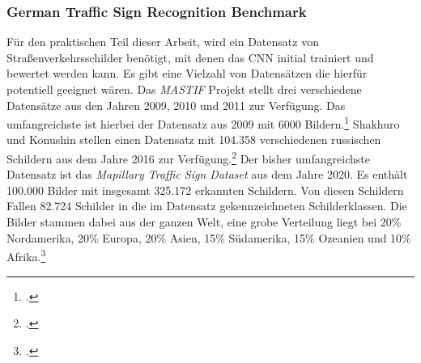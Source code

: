 \subsubsection{German Traffic Sign Recognition Benchmark}
Für den praktischen Teil dieser Arbeit, wird ein Datensatz von Straßenverkehrsschilder benötigt, mit denen das \ac{CNN} initial trainiert und bewertet werden kann. Es gibt eine Vielzahl von Datensätzen die hierfür potentiell geeignet wären. Das \textit{\ac{MASTIF}} Projekt stellt drei verschiedene Datensätze aus den Jahren 2009, 2010 und 2011 zur Verfügung. Das umfangreichste ist hierbei der Datensatz aus 2009 mit 6000 Bildern.\footcite[Vgl.][S. 66-73]{vsegvic2010computer} Shakhuro und Konushin stellen einen Datensatz mit 104.358 verschiedenen russischen Schildern aus dem Jahre 2016 zur Verfügung.\footcite[Vgl.][S. 294-300]{rtsd} Der bisher umfangreichste Datensatz ist das \textit{Mapillary Traffic Sign Dataset} aus dem Jahre 2020. Es enthält 100.000 Bilder mit insgesamt 325.172 erkannten Schildern. Von diesen Schildern Fallen 82.724 Schilder in die im Datensatz gekennzeichneten Schilderklassen. Die Bilder stammen dabei aus der ganzen Welt, eine grobe Verteilung liegt bei 20\% Nordamerika, 20\% Europa, 20\% Asien, 15\% Südamerika, 15\% Ozeanien und 10\% Afrika.\footcite[Vgl.][S. 1-17]{ertlerMapillaryTrafficSign2020}

